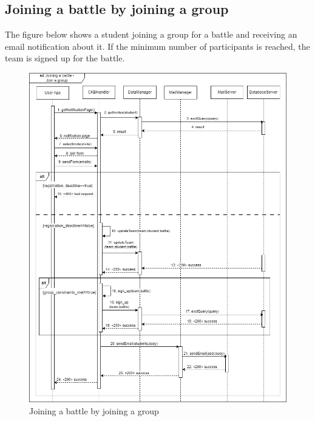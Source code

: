 \subsection{Joining a battle by joining a group}
The figure below shows a student joining a group for a battle and receiving an email notification about it. If the 
minimum number of participants is reached, the team is signed up for the battle.\\
\begin{figure}[H]
    \centering
    \includegraphics[width=1\textwidth]{images/seq_diagrams/joining_battle_join_group_DD.png}
    \caption{Joining a battle by joining a group}
\end{figure}
\clearpage

